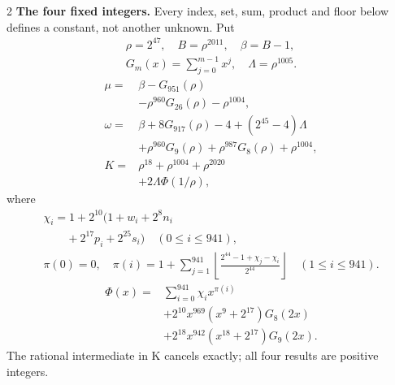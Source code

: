 \documentclass[10pt]{article}
\newcommand{\fl}[1]{\left\lfloor#1\right\rfloor}
\begin{document}
\begin{multicols}{2}\fontsize{7.7}{8.2}\selectfont
\textbf{The four fixed integers.}
Every index, set, sum, product and floor below defines a constant, not
another unknown. Put
\[
\begin{gathered}
\rho=2^{47},\quad B=\rho^{2011},\quad\beta=B-1,\\
G_m(x)=\sum_{j=0}^{m-1}x^j,\quad
\Lambda=\rho^{1005}.
\end{gathered}
\]
\begin{align*}
\mu={}&\beta-G_{951}(\rho)\\
&-\rho^{960}G_{26}(\rho)-\rho^{1004},\\
\omega={}&\beta+8G_{917}(\rho)-4+(2^{45}-4)\Lambda\\
&+\rho^{960}G_9(\rho)+\rho^{987}G_8(\rho)
  +\rho^{1004},\\
K={}&\rho^{18}+\rho^{1004}+\rho^{2020}\\
&+2\Lambda\Phi(1/\rho),
\end{align*}
where
\[
\begin{gathered}
\chi_i=1+2^{10}(1+w_i+2^8n_i\\
\qquad+2^{17}p_i+2^{25}s_i)\quad(0\le i\le941),\\
\pi(0)=0,\quad\pi(i)=1+\sum_{j=1}^{941}
\fl{\frac{2^{44}-1+\chi_j-\chi_i}{2^{44}}}\quad(1\le i\le941).
\end{gathered}
\]
\[
\begin{split}
\Phi(x)={}&\sum_{i=0}^{941}\chi_i x^{\pi(i)}\\
&+2^{10}x^{969}(x^9+2^{17})G_8(2x)\\
&+2^{18}x^{942}(x^{18}+2^{17})G_9(2x).
\end{split}
\]
The rational intermediate in K cancels exactly; all four results are positive integers.


\end{multicols}
\end{document}
